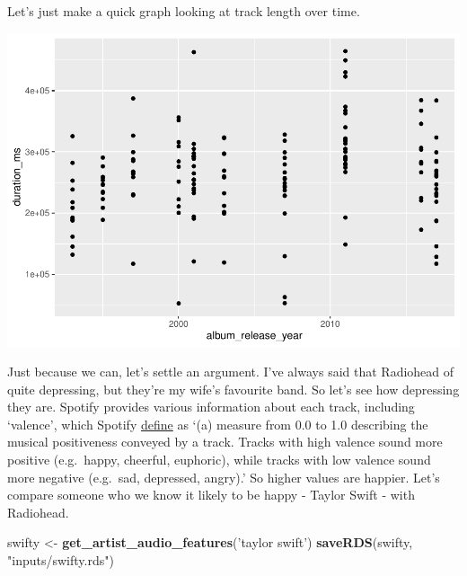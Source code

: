 \documentclass[
]{book}
\newenvironment{Shaded}{\begin{snugshade}}{\end{snugshade}}
\newcommand{\DataTypeTok}[1]{\textcolor[rgb]{0.13,0.29,0.53}{#1}}
\newcommand{\KeywordTok}[1]{\textcolor[rgb]{0.13,0.29,0.53}{\textbf{#1}}}
\newcommand{\NormalTok}[1]{#1}
\newcommand{\OperatorTok}[1]{\textcolor[rgb]{0.81,0.36,0.00}{\textbf{#1}}}
\newcommand{\StringTok}[1]{\textcolor[rgb]{0.31,0.60,0.02}{#1}}
\begin{document}
Let's just make a quick graph looking at track length over time.

\begin{Shaded}
\end{Shaded}

\includegraphics{telling_stories_with_data_files/figure-latex/unnamed-chunk-144-1.pdf}

Just because we can, let's settle an argument. I've always said that Radiohead of quite depressing, but they're my wife's favourite band. So let's see how depressing they are. Spotify provides various information about each track, including `valence', which Spotify \href{https://developer.spotify.com/documentation/web-api/reference/tracks/get-audio-features/}{define} as `(a) measure from 0.0 to 1.0 describing the musical positiveness conveyed by a track. Tracks with high valence sound more positive (e.g.~happy, cheerful, euphoric), while tracks with low valence sound more negative (e.g.~sad, depressed, angry).' So higher values are happier. Let's compare someone who we know it likely to be happy - Taylor Swift - with Radiohead.

\begin{Shaded}
\begin{Highlighting}[]
\NormalTok{swifty <-}\StringTok{ }\KeywordTok{get_artist_audio_features}\NormalTok{(}\StringTok{'taylor swift'}\NormalTok{)}
\KeywordTok{saveRDS}\NormalTok{(swifty, }\StringTok{"inputs/swifty.rds"}\NormalTok{)}
\end{Highlighting}
\end{Shaded}
\end{document}
